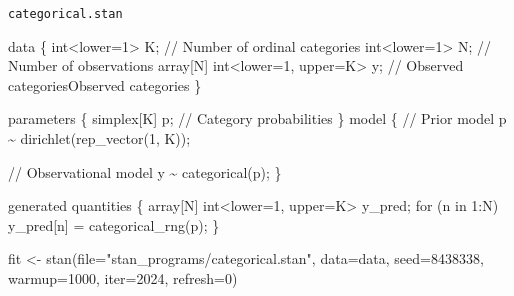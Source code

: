 \documentclass[
  letterpaper,
  DIV=11,
  numbers=noendperiod]{scrartcl}
\newenvironment{Shaded}{\begin{snugshade}}{\end{snugshade}}
\newcommand{\AttributeTok}[1]{\textcolor[rgb]{0.40,0.45,0.13}{#1}}
\newcommand{\CommentTok}[1]{\textcolor[rgb]{0.37,0.37,0.37}{#1}}
\newcommand{\ControlFlowTok}[1]{\textcolor[rgb]{0.00,0.23,0.31}{#1}}
\newcommand{\DataTypeTok}[1]{\textcolor[rgb]{0.68,0.00,0.00}{#1}}
\newcommand{\DecValTok}[1]{\textcolor[rgb]{0.68,0.00,0.00}{#1}}
\newcommand{\FunctionTok}[1]{\textcolor[rgb]{0.28,0.35,0.67}{#1}}
\newcommand{\KeywordTok}[1]{\textcolor[rgb]{0.00,0.23,0.31}{#1}}
\newcommand{\NormalTok}[1]{\textcolor[rgb]{0.00,0.23,0.31}{#1}}
\newcommand{\OtherTok}[1]{\textcolor[rgb]{0.00,0.23,0.31}{#1}}
\newcommand{\StringTok}[1]{\textcolor[rgb]{0.13,0.47,0.30}{#1}}
\begin{document}
\begin{codelisting}

\caption{\texttt{categorical.stan}}

\begin{Shaded}
\begin{Highlighting}[]
\KeywordTok{data}\NormalTok{ \{}
  \DataTypeTok{int}\NormalTok{\textless{}}\KeywordTok{lower}\NormalTok{=}\DecValTok{1}\NormalTok{\textgreater{} K;                   }\CommentTok{// Number of ordinal categories}
  \DataTypeTok{int}\NormalTok{\textless{}}\KeywordTok{lower}\NormalTok{=}\DecValTok{1}\NormalTok{\textgreater{} N;                   }\CommentTok{// Number of observations}
  \DataTypeTok{array}\NormalTok{[N] }\DataTypeTok{int}\NormalTok{\textless{}}\KeywordTok{lower}\NormalTok{=}\DecValTok{1}\NormalTok{, }\KeywordTok{upper}\NormalTok{=K\textgreater{} y; }\CommentTok{// Observed categoriesObserved categories}
\NormalTok{\}}

\KeywordTok{parameters}\NormalTok{ \{}
  \DataTypeTok{simplex}\NormalTok{[K] p; }\CommentTok{// Category probabilities}
\NormalTok{\}}
\KeywordTok{model}\NormalTok{ \{}
  \CommentTok{// Prior model}
\NormalTok{  p \textasciitilde{} dirichlet(rep\_vector(}\DecValTok{1}\NormalTok{, K));}
  
  \CommentTok{// Observational model}
\NormalTok{  y \textasciitilde{} categorical(p);}
\NormalTok{\}}

\KeywordTok{generated quantities}\NormalTok{ \{}
  \DataTypeTok{array}\NormalTok{[N] }\DataTypeTok{int}\NormalTok{\textless{}}\KeywordTok{lower}\NormalTok{=}\DecValTok{1}\NormalTok{, }\KeywordTok{upper}\NormalTok{=K\textgreater{} y\_pred;}
  \ControlFlowTok{for}\NormalTok{ (n }\ControlFlowTok{in} \DecValTok{1}\NormalTok{:N)}
\NormalTok{    y\_pred[n] = categorical\_rng(p);}
\NormalTok{\}}
\end{Highlighting}
\end{Shaded}

\end{codelisting}

\begin{Shaded}
\begin{Highlighting}[]
\NormalTok{fit }\OtherTok{\textless{}{-}} \FunctionTok{stan}\NormalTok{(}\AttributeTok{file=}\StringTok{"stan\_programs/categorical.stan"}\NormalTok{,}
            \AttributeTok{data=}\NormalTok{data, }\AttributeTok{seed=}\DecValTok{8438338}\NormalTok{,}
            \AttributeTok{warmup=}\DecValTok{1000}\NormalTok{, }\AttributeTok{iter=}\DecValTok{2024}\NormalTok{, }\AttributeTok{refresh=}\DecValTok{0}\NormalTok{)}
\end{Highlighting}
\end{Shaded}
\end{document}
